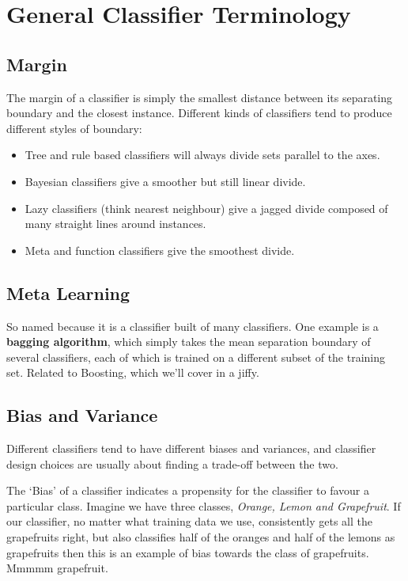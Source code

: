 \documentclass{article}
\begin{document}
\section{General Classifier Terminology}
    \subsection{Margin}
        The margin of a classifier is simply the smallest distance between its separating boundary and the closest instance. Different kinds of classifiers tend to produce different styles of boundary:       
        \begin{itemize}
            \item Tree and rule based classifiers will always divide sets parallel to the axes.
        
            \item Bayesian classifiers give a smoother but still linear divide.
        
            \item Lazy classifiers (think nearest neighbour) give a jagged divide composed of many straight lines around instances.
        
            \item Meta and function classifiers give the smoothest divide.
        \end{itemize}
    \subsection{Meta Learning}
        So named because it is a classifier built of many classifiers. One example is a \textbf{bagging algorithm}, which simply takes the mean separation boundary of several classifiers, each of which is trained on a different subset of the training set. Related to Boosting, which we'll cover in a jiffy.
        
    \subsection{Bias and Variance}
        Different classifiers tend to have different biases and variances, and classifier design choices are usually about finding a trade-off between the two.
        
        The `Bias' of a classifier indicates a propensity for the classifier to favour a particular class. Imagine we have three classes, \emph{Orange, Lemon and Grapefruit}. If our classifier, no matter what training data we use, consistently gets all the grapefruits right, but also classifies half of the oranges and half of the lemons as grapefruits then this is an example of bias towards the class of grapefruits. Mmmmm grapefruit.
        
\end{document}
